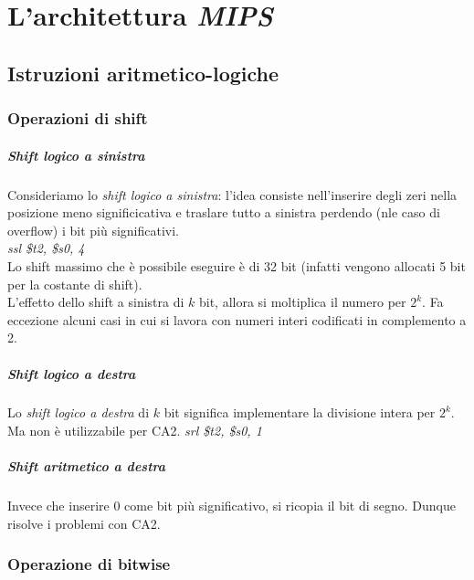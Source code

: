 \documentclass[class=book, crop=false]{standalone}
\begin{document}
\chapter{L'architettura \emph{MIPS}}

\section{Istruzioni aritmetico-logiche}
\subsection{Operazioni di shift}
\paragraph{Shift logico a sinistra}
Consideriamo lo \emph{shift logico a sinistra}: l'idea consiste nell'inserire degli zeri nella posizione meno significicativa e traslare tutto a sinistra perdendo (nle caso di overflow) i bit più significativi.\\
\emph{ssl \$t2, \$s0, 4}\\
Lo shift massimo che è possibile eseguire è di 32 bit (infatti vengono allocati 5 bit per la costante di shift).\\
L'effetto dello shift a sinistra di \(k\) bit, allora si moltiplica il numero per \(2^k\). Fa eccezione alcuni casi in cui si lavora con numeri interi codificati in complemento a 2.\\

\paragraph{Shift logico a destra}
Lo \emph{shift logico a destra} di \(k\) bit significa implementare la divisione intera per \(2^k\). Ma non è utilizzabile per CA2.
\emph{srl \$t2, \$s0, 1}

\paragraph{Shift aritmetico a destra}
Invece che inserire 0 come bit più significativo, si ricopia il bit di segno. Dunque risolve i problemi con CA2.


\subsection{Operazione di bitwise}
\end{document}
